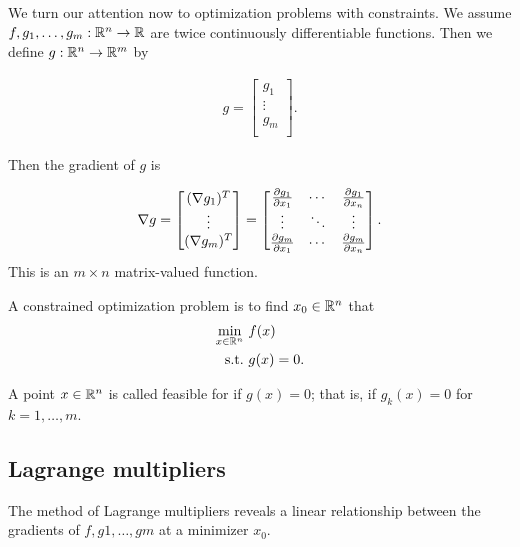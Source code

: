 We turn our attention now to optimization problems with constraints.
We assume $f, g_1, \dots, g_m : \mathbb{R}^n \to \mathbb{R}$ are twice continuously differentiable functions.
Then we define $g:\mathbb{R}^n \to \mathbb{R}^m$ by

\begin{align}
g = \begin{bmatrix}
g_1\\
\vdots\\
g_m\\
\end{bmatrix}.
\end{align}

Then the gradient of $g$ is

\begin{align}
\nabla g = \begin{bmatrix}
(\nabla g_1)^T\\
\vdots\\
(\nabla g_m)^T\\
\end{bmatrix}
= \begin{bmatrix}
\frac{\partial g_1}{\partial x_1} & \cdots & \frac{\partial g_1}{\partial x_n} \\
\vdots & \ddots & \vdots \\
\frac{\partial g_m}{\partial x_1} & \cdots & \frac{\partial g_m}{\partial x_n} \\
\end{bmatrix}.
\end{align}
This is an $m \times n$ matrix-valued function.

\begin{definition}
A constrained optimization problem is to find $x_0 \in \mathbb{R}^n$ that
\begin{align}
\min_{x\in\mathbb{R}^n} \ & f(x) \\
\mathrm{s.t. \ } & g(x) = 0.
\end{align}
\end{definition}

\begin{definition}
A point $x \in \mathbb{R}^n$ is called feasible for if $g(x) = 0$; that is, if $g_k(x) = 0$ for $k = 1, \dots, m$.
\end{definition}

\subsection{Lagrange multipliers}

The method of Lagrange multipliers reveals a linear relationship between the gradients of $f, g1, \dots, gm$ at a minimizer $x_0$.

